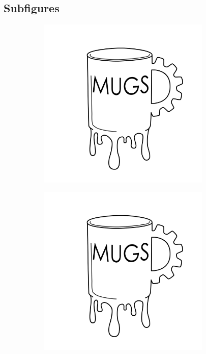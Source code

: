 \documentclass[11pt]{article}
\begin{document}
\subsection{Subfigures}

\begin{figure}[H]
	\begin{subfigure}[b]{0.5\textwidth}
		\centering
		\includegraphics[width=0.9\textwidth]{"images/half filled mugs"}
	\end{subfigure}
	\hfill
	\begin{subfigure}[b]{0.5\textwidth}
		\centering
		\includegraphics[width=0.9\textwidth]{"images/half filled mugs"}

\end{subfigure}
\end{figure}
\end{document}
